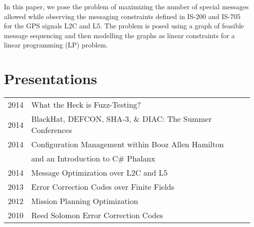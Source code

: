 \documentclass[letterpaper]{deedy-resume} %
\begin{document}
\begin{minipage}[t]{0.66\textwidth}
\sectionspace %



In this paper, we pose the problem of maximizing the number of special messages allowed while observing the messaging constraints defined in IS-200 and IS-705 for the GPS signals L2C and L5.  The problem is posed using a graph of feasible message sequencing and then modelling the graphs as linear constraints for a linear programming (LP) problem.
\sectionspace %


\section{Presentations} 

\begin{tabular}{rll}
2014	 & What the Heck is Fuzz-Testing?\\
2014	 & BlackHat, DEFCON, SHA-3, \& DIAC: The Summer Conferences\\
2014	 & Configuration Management within Booz Allen Hamilton \\
& and an Introduction to C\# Phalanx\\
2014 & Message Optimization over L2C and L5\\
2013 & Error Correction Codes over Finite Fields \\
2012 & Mission Planning Optimization \\
2010 & Reed Solomon Error Correction Codes\\
\end{tabular}






\end{minipage}
\end{document}
